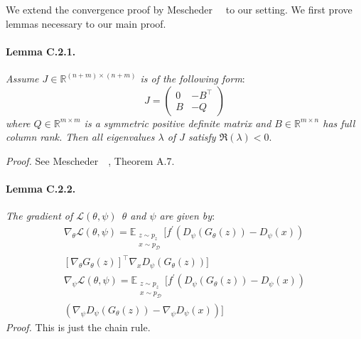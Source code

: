 We extend the convergence proof by Mescheder~\etal~\cite{r1} to our setting. We first prove lemmas necessary to our main proof.

\paragraph{Lemma C.2.1.} \emph{Assume $J\in\mathbb{R}^{(n+m)\times(n+m)}$ is of the following form}:
\begin{equation}
J=\begin{pmatrix}
0 & -B^\top\\ 
B & -Q
\end{pmatrix}
\end{equation}
\emph{where $Q\in\mathbb{R}^{m\times m}$ is a symmetric positive definite matrix and $B\in\mathbb{R}^{m\times n}$ has full column rank. Then all eigenvalues $\lambda$ of $J$ satisfy $\Re(\lambda)< 0$}.

\emph{Proof.} See Mescheder~\etal~\cite{r1}, Theorem A.7.

\paragraph{Lemma C.2.2.} \emph{The gradient of $\mathcal{L}(\theta,\psi)$~\wrt $\theta$ and $\psi$ are given by}:
\begin{align}
\nabla_\theta\mathcal{L}(\theta,\psi)=\mathbb{E}_{\substack{z\sim p_z\\x\sim p_\mathcal{D}}}[f^\prime(D_\psi(G_\theta(z))-D_\psi(x)) \nonumber \\ 
\left[\nabla_\theta G_\theta(z)\right]^\top\nabla_xD_\psi(G_\theta(z))] \\
\label{grad_psi}
\nabla_\psi\mathcal{L}(\theta,\psi)=\mathbb{E}_{\substack{z\sim p_z\\x\sim p_\mathcal{D}}}[f^\prime(D_\psi(G_\theta(z))-D_\psi(x)) \nonumber \\
(\nabla_\psi D_\psi(G_\theta(z))-\nabla_\psi D_\psi(x))]
\end{align}
\emph{Proof.} This is just the chain rule.

